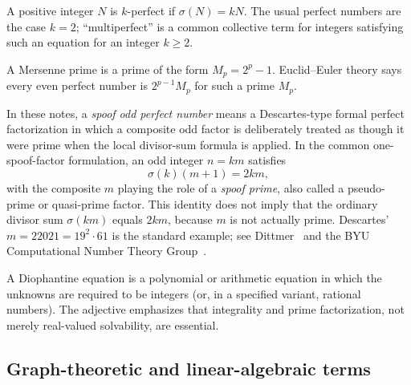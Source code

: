 \documentclass[11pt]{article}
\theoremstyle{definition}
\theoremstyle{remark}
\begin{document}
\begin{description}[style=nextline,leftmargin=1.5em]
\item[$k$-perfect or multiperfect number.]
A positive integer $N$ is $k$-perfect if $\sigma(N)=kN$.  The usual perfect
numbers are the case $k=2$; ``multiperfect'' is a common collective term for
integers satisfying such an equation for an integer $k\ge2$.

\item[Mersenne prime.]
A Mersenne prime is a prime of the form $M_p=2^p-1$.  Euclid--Euler theory
says every even perfect number is $2^{p-1}M_p$ for such a prime $M_p$.

\item[Spoof odd perfect number; spoof prime.]
In these notes, a \emph{spoof odd perfect number} means a Descartes-type
formal perfect factorization in which a composite odd factor is deliberately
treated as though it were prime when the local divisor-sum formula is
applied.  In the common one-spoof-factor formulation, an odd integer $n=km$
satisfies
\[
\sigma(k)(m+1)=2km,
\]
with the composite $m$ playing the role of a \emph{spoof prime}, also called
a pseudo-prime or quasi-prime factor.  This identity does not imply that the
ordinary divisor sum $\sigma(km)$ equals $2km$, because $m$ is not actually
prime.  Descartes' $m=22021=19^2\cdot61$ is the standard example; see
Dittmer~\cite{Dittmer} and the BYU Computational Number Theory Group~\cite{BYU2022}.

\item[Diophantine equation.]
A Diophantine equation is a polynomial or arithmetic equation in which the
unknowns are required to be integers (or, in a specified variant, rational
numbers).  The adjective emphasizes that integrality and prime factorization,
not merely real-valued solvability, are essential.
\end{description}

\subsection*{Graph-theoretic and linear-algebraic terms}
\end{document}
